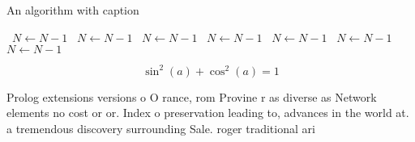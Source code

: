 \documentclass[a4paper]{article}
\begin{document}
\begin{algorithm}
\caption{An algorithm with caption}
\begin{algorithmic}
\    \State $N \gets N - 1$
\    \State $N \gets N - 1$
\    \State $N \gets N - 1$
\    \State $N \gets N - 1$
\    \State $N \gets N - 1$
\    \State $N \gets N - 1$
\    \State $N \gets N - 1$
\EndWhile
\end{algorithmic}
\end{algorithm}

\[ \sin^2(a)+\cos^2(a) = 1 \]

Prolog extensions versions o O rance, rom Provine r as diverse as Network elements no cost or or. Index o preservation leading to, advances in the world at. a tremendous discovery surrounding Sale. roger traditional ari
\end{document}
